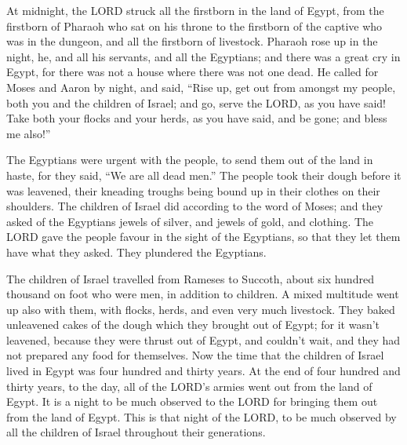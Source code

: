  At midnight, the LORD struck all the firstborn in the
land of Egypt, from the firstborn of Pharaoh who sat on his throne to
the firstborn of the captive who was in the dungeon, and all the
firstborn of livestock.  Pharaoh rose up in the night,
he, and all his servants, and all the Egyptians; and there was a great
cry in Egypt, for there was not a house where there was not one dead.
 He called for Moses and Aaron by night, and said, ``Rise
up, get out from amongst my people, both you and the children of Israel;
and go, serve the LORD, as you have said!  Take both your
flocks and your herds, as you have said, and be gone; and bless me
also!''

 The Egyptians were urgent with the people, to send them
out of the land in haste, for they said, ``We are all dead men.''
 The people took their dough before it was leavened,
their kneading troughs being bound up in their clothes on their
shoulders.  The children of Israel did according to the
word of Moses; and they asked of the Egyptians jewels of silver, and
jewels of gold, and clothing.  The LORD gave the people
favour in the sight of the Egyptians, so that they let them have what
they asked. They plundered the Egyptians.

 The children of Israel travelled from Rameses to
Succoth, about six hundred thousand on foot who were men, in addition to
children.  A mixed multitude went up also with them, with
flocks, herds, and even very much livestock.  They baked
unleavened cakes of the dough which they brought out of Egypt; for it
wasn't leavened, because they were thrust out of Egypt, and couldn't
wait, and they had not prepared any food for themselves. 
Now the time that the children of Israel lived in Egypt was four hundred
and thirty years.  At the end of four hundred and thirty
years, to the day, all of the LORD's armies went out from the land of
Egypt.  It is a night to be much observed to the LORD for
bringing them out from the land of Egypt. This is that night of the
LORD, to be much observed by all the children of Israel throughout their
generations.


